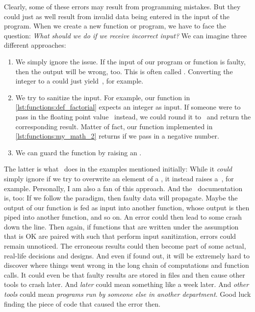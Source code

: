 Clearly, some of these errors may result from programming mistakes.
But they could just as well result from invalid data being entered in the input of the program.%
%
%
When we create a new function or program, we have to face the question:
\emph{What should we do if we receive incorrect input?}
We can imagine three different approaches:%
%
\begin{enumerate}%
%
\item We simply ignore the issue.
If the input of our program or function is faulty, then the output will be wrong, too.
This is often called .
Converting the integer  to a  could just yield~, for example.%
%
\item We try to sanitize the input.
For example, our  function in \cref{lst:functions:def_factorial} expects an integer as input.
If someone were to pass in the floating point value~ instead, we could round it to~ and return the corresponding result.
Matter of fact, our  function implemented in \cref{lst:functions:my_math_2} returns  if we pass in a negative number.%
%
\item We can guard the function by raising an .%
%
\end{enumerate}%
%
The latter is what \python\ does in the examples mentioned initially:
While it \emph{could} simply ignore if we try to overwrite an element of a , it instead raises a~, for example.
Personally, I am also a fan of this approach.
And the \python\ documentation is, too:%
%
%
%
If we follow the  paradigm, then faulty data will propagate.
Maybe the output of our function is fed as input into another function, whose output is then piped into another function, and so on.
An error could then lead to some crash down the line.
Then again, if functions that are written under the assumption that  is OK are paired with such that perform input sanitization, errors could remain unnoticed.
The erroneous results could then become part of some actual, real-life decisions and designs.
And even if found out, it will be extremely hard to discover where things went wrong in the long chain of computations and function calls.
It could even be that faulty results are stored in files and then cause other tools to crash later.
And \emph{later} could mean something like a week later.
And \emph{other tools} could mean \emph{programs run by someone else in another department}.
Good luck finding the piece of code that caused the error then.

